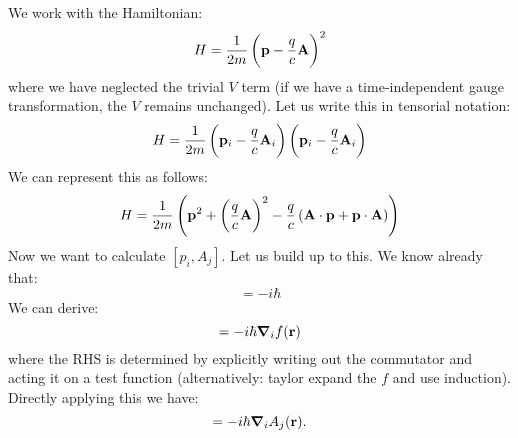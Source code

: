 \subsection{}
We work with the Hamiltonian:
\begin{equation}
    H = \frac{1}{2m}\left(\mathbf{p} - \frac{q}{c}\mathbf{A}\right)^2
\end{equation}
where we have neglected the trivial $V$ term (if we have a time-independent gauge transformation, the $V$ remains unchanged). Let us write this in tensorial notation:
\begin{equation}
    H = \frac{1}{2m}\left(\mathbf{p}_i - \frac{q}{c}\mathbf{A}_i\right)\left(\mathbf{p}_i - \frac{q}{c}\mathbf{A}_i\right)
\end{equation}
We can represent this as follows:
\begin{equation}
    H = \frac{1}{2m}\left(\mathbf{p}^2 + \left(\frac{q}{c}\mathbf{A}\right)^2 - \frac{q}{c}\left(\mathbf{A} \cdot \mathbf{p} + \mathbf{p}\cdot\mathbf{A}\right)\right)
\end{equation}
Now we want to calculate $[p_i, A_j]$. Let us build up to this. We know already that:
\begin{equation}
    [p_x, x] = -i\hbar
\end{equation}
We can derive:
\begin{equation}
    [p_i, f(\v{r})] = -i\hbar \nabla_i f(\v{r})
\end{equation}
where the RHS is determined by explicitly writing out the commutator and acting it on a test function (alternatively: taylor expand the $f$ and use induction). Directly applying this we have:
\begin{equation}
    [p_i, A_j(\v{r})] = -i\hbar \nabla_i A_j(\v{r}).
\end{equation}

